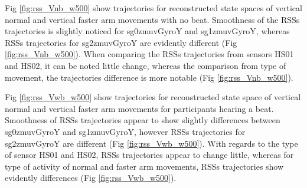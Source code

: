 Fig \ref{fig:rss_Vnb_w500} show trajectories for reconstructed state spaces
of vertical normal and vertical faster arm movements with no beat. 
Smoothness of the RSSs trajectories is slightly noticed for sg0zmuvGyroY and
sg1zmuvGyroY, whereas RSSs trajectories for sg2zmuvGyroY are evidently 
different (Fig \ref{fig:rss_Vnb_w500}).
When comparing the RSSs trajectories from sensors HS01 and HS02,
it can be noted little change, whereas the comparison from type of movement, 
the trajectories difference is more notable (Fig \ref{fig:rss_Vnb_w500}).

Fig \ref{fig:rss_Vwb_w500} show trajectories for reconstructed state space
of vertical normal and vertical faster arm movements for participants 
hearing a beat. Smoothness of RSSs trajectories appear to show slightly 
differences between sg0zmuvGyroY and sg1zmuvGyroY, however RSSs trajectories 
for sg2zmuvGyroY are different (Fig \ref{fig:rss_Vwb_w500}).
With regards to the type of sensor HS01 and HS02, RSSs trajectories appear 
to change little, whereas for type of activity of normal and faster arm 
movements, RSSs trajectories show evidently differences 
(Fig \ref{fig:rss_Vwb_w500}).


